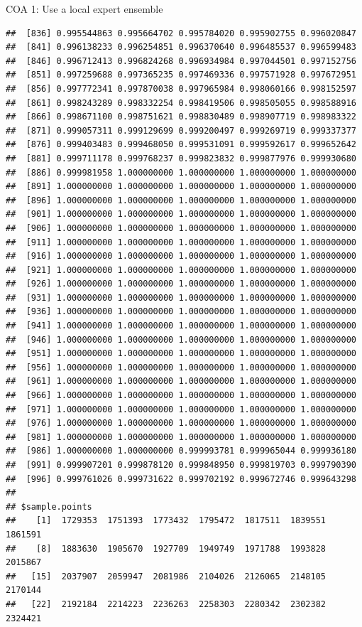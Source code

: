 \documentclass[ignorenonframetext,]{beamer}
\begin{document}
\begin{frame}[fragile]{COA 1: Use a local expert ensemble}
\begin{verbatim}
##  [836] 0.995544863 0.995664702 0.995784020 0.995902755 0.996020847
##  [841] 0.996138233 0.996254851 0.996370640 0.996485537 0.996599483
##  [846] 0.996712413 0.996824268 0.996934984 0.997044501 0.997152756
##  [851] 0.997259688 0.997365235 0.997469336 0.997571928 0.997672951
##  [856] 0.997772341 0.997870038 0.997965984 0.998060166 0.998152597
##  [861] 0.998243289 0.998332254 0.998419506 0.998505055 0.998588916
##  [866] 0.998671100 0.998751621 0.998830489 0.998907719 0.998983322
##  [871] 0.999057311 0.999129699 0.999200497 0.999269719 0.999337377
##  [876] 0.999403483 0.999468050 0.999531091 0.999592617 0.999652642
##  [881] 0.999711178 0.999768237 0.999823832 0.999877976 0.999930680
##  [886] 0.999981958 1.000000000 1.000000000 1.000000000 1.000000000
##  [891] 1.000000000 1.000000000 1.000000000 1.000000000 1.000000000
##  [896] 1.000000000 1.000000000 1.000000000 1.000000000 1.000000000
##  [901] 1.000000000 1.000000000 1.000000000 1.000000000 1.000000000
##  [906] 1.000000000 1.000000000 1.000000000 1.000000000 1.000000000
##  [911] 1.000000000 1.000000000 1.000000000 1.000000000 1.000000000
##  [916] 1.000000000 1.000000000 1.000000000 1.000000000 1.000000000
##  [921] 1.000000000 1.000000000 1.000000000 1.000000000 1.000000000
##  [926] 1.000000000 1.000000000 1.000000000 1.000000000 1.000000000
##  [931] 1.000000000 1.000000000 1.000000000 1.000000000 1.000000000
##  [936] 1.000000000 1.000000000 1.000000000 1.000000000 1.000000000
##  [941] 1.000000000 1.000000000 1.000000000 1.000000000 1.000000000
##  [946] 1.000000000 1.000000000 1.000000000 1.000000000 1.000000000
##  [951] 1.000000000 1.000000000 1.000000000 1.000000000 1.000000000
##  [956] 1.000000000 1.000000000 1.000000000 1.000000000 1.000000000
##  [961] 1.000000000 1.000000000 1.000000000 1.000000000 1.000000000
##  [966] 1.000000000 1.000000000 1.000000000 1.000000000 1.000000000
##  [971] 1.000000000 1.000000000 1.000000000 1.000000000 1.000000000
##  [976] 1.000000000 1.000000000 1.000000000 1.000000000 1.000000000
##  [981] 1.000000000 1.000000000 1.000000000 1.000000000 1.000000000
##  [986] 1.000000000 1.000000000 0.999993781 0.999965044 0.999936180
##  [991] 0.999907201 0.999878120 0.999848950 0.999819703 0.999790390
##  [996] 0.999761026 0.999731622 0.999702192 0.999672746 0.999643298
## 
## $sample.points
##    [1]  1729353  1751393  1773432  1795472  1817511  1839551  1861591
##    [8]  1883630  1905670  1927709  1949749  1971788  1993828  2015867
##   [15]  2037907  2059947  2081986  2104026  2126065  2148105  2170144
##   [22]  2192184  2214223  2236263  2258303  2280342  2302382  2324421

\end{verbatim}
\end{frame}
\end{document}
